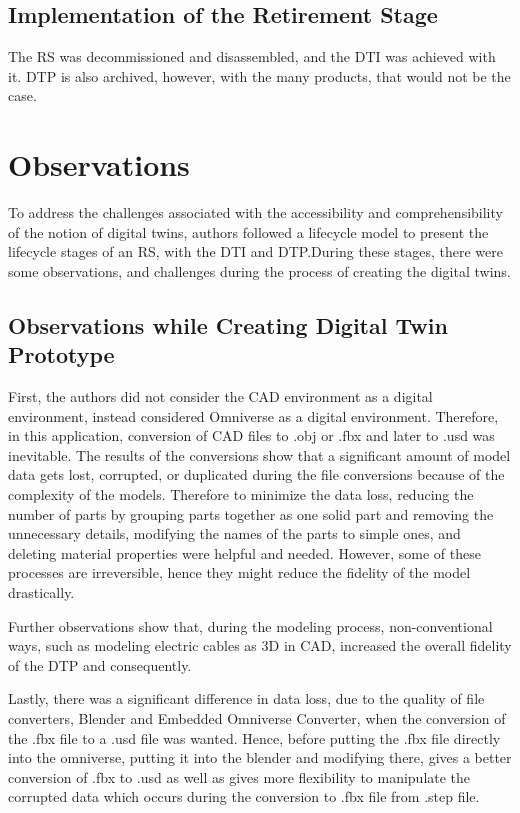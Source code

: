 \documentclass[conference]{IEEEtran}
\begin{document}
    \subsection{Implementation of the Retirement Stage}
    The RS was decommissioned and disassembled, and the DTI was achieved with it. DTP is also archived, however, with the many products, that would not be the case.

    \section{Observations} 
    To address the challenges associated with the accessibility and comprehensibility of the notion of digital twins, authors followed a lifecycle model to present the lifecycle stages of an RS, with the DTI and DTP.During these stages, there were some observations, and challenges during the process of creating the digital twins. 
    
    \subsection{Observations while Creating Digital Twin Prototype}

    First, the authors did not consider the CAD environment as a digital environment, instead considered Omniverse as a digital environment. Therefore, in this application, conversion of CAD files to .obj or .fbx and later to .usd was inevitable. The results of the conversions show that a significant amount of model data gets lost, corrupted, or duplicated during the file conversions because of the complexity of the models. Therefore to minimize the data loss, reducing the number of parts by grouping parts together as one solid part and removing the unnecessary details, modifying the names of the parts to simple ones, and deleting material properties were helpful and needed. However, some of these processes are irreversible, hence they might reduce the fidelity of the model drastically.

    Further observations show that, during the modeling process, non-conventional ways, such as modeling electric cables as 3D in CAD, increased the overall fidelity of the DTP and consequently.

    Lastly, there was a significant difference in data loss, due to the quality of file converters, Blender and Embedded Omniverse Converter, when the conversion of the .fbx file to a .usd file was wanted. Hence, before putting the .fbx file directly into the omniverse, putting it into the blender and modifying there,  gives a better conversion of .fbx to .usd as well as gives more flexibility to manipulate the corrupted data which occurs during the conversion to .fbx file from .step file.
\end{document}
